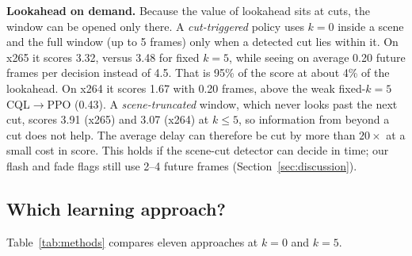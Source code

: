 \documentclass[conference]{IEEEtran}
\newcommand{\cqlppo}{CQL$\to$PPO}
\begin{document}
\textbf{Lookahead on demand.} Because the value of lookahead sits at cuts, the window can be opened only there. A \emph{cut-triggered} policy uses $k{=}0$ inside a scene and the full window (up to 5 frames) only when a detected cut lies within it. On x265 it scores 3.32, versus 3.48 for fixed $k{=}5$, while seeing on average 0.20 future frames per decision instead of 4.5. That is 95\% of the score at about 4\% of the lookahead. On x264 it scores 1.67 with 0.20 frames, above the weak fixed-$k{=}5$ \cqlppo{} (0.43). A \emph{scene-truncated} window, which never looks past the next cut, scores 3.91 (x265) and 3.07 (x264) at $k{\le}5$, so information from beyond a cut does not help. The average delay can therefore be cut by more than $20\times$ at a small cost in score. This holds if the scene-cut detector can decide in time; our flash and fade flags still use 2--4 future frames (Section~\ref{sec:discussion}).

\subsection{Which learning approach?}\label{sec:methods}
Table~\ref{tab:methods} compares eleven approaches at $k{=}0$ and $k{=}5$.
\end{document}
